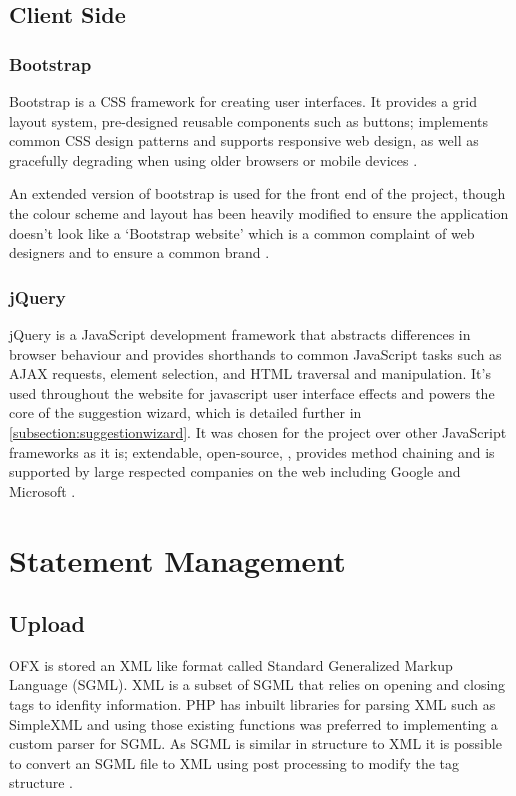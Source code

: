 \subsection{Client Side}
\subsubsection{Bootstrap}
Bootstrap is a CSS framework for creating user interfaces. It provides a grid layout system, pre-designed reusable components such as buttons; implements common CSS design patterns and supports responsive web design, as well as gracefully degrading when using older browsers or mobile devices \parencite{bootstrap2014bootstrap}.

An extended version of bootstrap is used for the front end of the project, though the colour scheme and layout has been heavily modified to ensure the application doesn't look like a `Bootstrap website' which is a common complaint of web designers and to ensure a common brand \parencite{kizler2013bootstrap, carrico2013bootstrap}.

\subsubsection{jQuery}
jQuery is a JavaScript development framework that abstracts differences in browser behaviour and provides shorthands to common JavaScript tasks such as AJAX requests, element selection, and HTML traversal and manipulation.
%
It's used throughout the website for javascript user interface effects and powers the core of the  suggestion wizard, which is detailed further in \autoref{subsection:suggestionwizard}.
%
It was chosen for the project over other JavaScript frameworks as it is; extendable, open-source, , provides method chaining and is supported by large respected companies on the web including Google and Microsoft \parencite{jquery2014jquery}.

\section[Statement Management]{Statement Management}

\subsection{Upload}
OFX is stored an XML like format called Standard Generalized Markup Language (SGML). XML is a subset of SGML that relies on opening and closing tags to idenfity information. PHP has inbuilt libraries for parsing XML such as SimpleXML and using those existing functions was preferred to implementing a custom parser for SGML. As SGML is similar in structure to XML it is possible to convert an SGML file to XML using post processing to modify the tag structure \parencite{stackoverflow2013sgml, Hanselman2006sgml}. 

